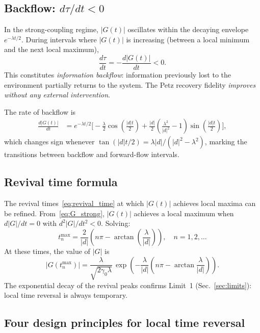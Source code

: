 \documentclass[prl,twocolumn,superscriptaddress,longbibliography]{revtex4-2}
\newcommand{\abs}[1]{\left|#1\right|}
\newcommand{\tauasym}{\tau}
\begin{document}
\subsection{Backflow: $d\tauasym/dt < 0$}

In the strong-coupling regime, $|G(t)|$ oscillates within the
decaying envelope $e^{-\lambda t/2}$.  During intervals where
$|G(t)|$ is increasing (between a local minimum and the next
local maximum),
\begin{equation}
\frac{d\tauasym}{dt} = -\frac{d|G(t)|}{dt} < 0.
\label{eq:backflow}
\end{equation}
This constitutes \emph{information backflow}: information previously
lost to the environment partially returns to the system.  The Petz
recovery fidelity \emph{improves without any external intervention}.

The rate of backflow is
\begin{align}
\frac{d|G(t)|}{dt} &= e^{-\lambda t/2}\bigg[
-\frac{\lambda}{2}\cos\!\left(\frac{|d|t}{2}\right)
+ \frac{|d|}{2}\left(\frac{\lambda^2}{|d|^2} - 1\right)
\sin\!\left(\frac{|d|t}{2}\right)
\bigg],
\end{align}
which changes sign whenever
$\tan(|d|t/2) = \lambda |d| / (|d|^2 - \lambda^2)$,
marking the transitions between backflow and forward-flow intervals.

\subsection{Revival time formula}

The revival times~\eqref{eq:revival_time} at which $|G(t)|$
achieves local maxima can be refined.  From~\eqref{eq:G_strong},
$|G(t)|$ achieves a local maximum when
$d|G|/dt = 0$ with $d^2|G|/dt^2 < 0$.  Solving:
\begin{equation}
t_n^{\mathrm{max}} = \frac{2}{\abs{d}}\!\left(
n\pi - \arctan\!\left(\frac{\lambda}{\abs{d}}\right)\right),
\quad n = 1, 2, \ldots
\end{equation}
At these times, the value of $|G|$ is
\begin{equation}
|G(t_n^{\mathrm{max}})| = \frac{\lambda}{\sqrt{2\gamma_0\lambda}}\,
\exp\!\left(-\frac{\lambda}{\abs{d}}
\left(n\pi - \arctan\frac{\lambda}{\abs{d}}\right)\right).
\end{equation}
The exponential decay of the revival peaks confirms
Limit~1 (Sec.~\ref{sec:limits}): local time reversal is always
temporary.

\subsection{Four design principles for local time reversal}
\end{document}
